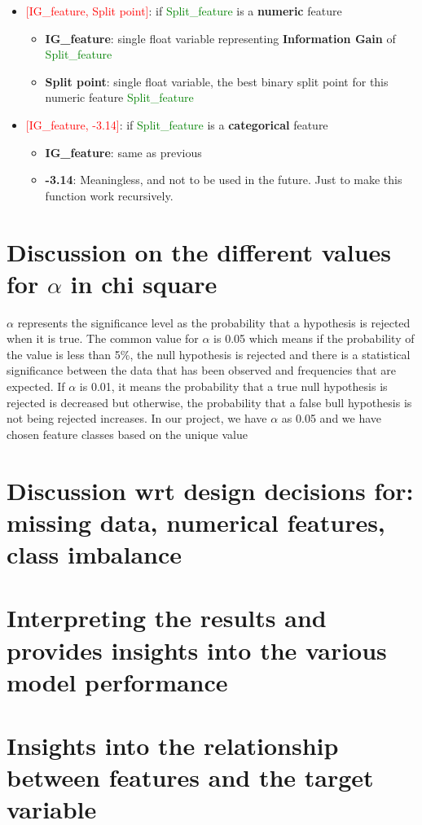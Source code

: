 \documentclass{article}
\begin{document}
\begin{itemize}
    \item \textcolor{red}{[IG\_feature, Split point]}: if \textcolor{green}{Split\_feature} is a \textbf{numeric} feature
        \begin{itemize}
            \item \textbf{IG\_feature}: single float variable representing \textbf{Information Gain} of \textcolor{green}{Split\_feature}
            \item \textbf{Split point}: single float variable, the best binary split point for this numeric feature \textcolor{green}{Split\_feature}
        \end{itemize}
    \item \textcolor{red}{[IG\_feature, -3.14]}: if \textcolor{green}{Split\_feature} is a \textbf{categorical} feature
        \begin{itemize}
            \item \textbf{IG\_feature}: same as previous
            \item \textbf{-3.14}: Meaningless, and not to be used in the future. Just to make this function work recursively.
        \end{itemize}
\end{itemize}


\section{Discussion on the different values for $\alpha$ in chi square}

$\alpha$ represents the significance level as the probability that a hypothesis is rejected when it is true. The common value for $\alpha$ is 0.05 which means if the probability of the value is less than 5\%, the null hypothesis is rejected and there is a statistical significance between the data that has been observed and frequencies that are expected. If $\alpha$ is 0.01, it means the probability that a true null hypothesis is rejected is decreased but otherwise, the probability that a false bull hypothesis is not being rejected increases. 
In our project, we have $\alpha$ as 0.05 and we have chosen feature classes based on the unique value 



\section{Discussion wrt design decisions for: missing data, numerical features, class imbalance}
\section{Interpreting the results and provides insights into the various model performance}
\section{Insights into the relationship between features and the target variable}
\end{document}
